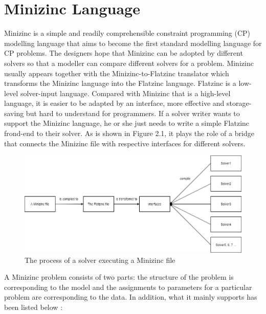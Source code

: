 \section{Minizinc Language}
Minizinc \cite{r10} is a simple and readily comprehensible constraint programming (CP) modelling language that aims to become the first standard modelling language for CP problems. The designers hope that Minizinc can be adopted by different solvers so that a modeller can compare different solvers for a problem. Minizinc usually appears together with the Minizinc-to-Flatzinc translator which transforms the Minizinc language into the Flatzinc language. Flatzinc \cite{r10} is a low-level solver-input language. Compared with Minizinc that is a high-level language, it is easier to be adapted by an interface, more effective and storage-saving but hard to understand for programmers. If a solver writer wants to support the Minizinc language, he or she just needs to write a simple Flatzinc frond-end to their solver. As is shown in Figure 2.1, it plays the role of a bridge that connects the Minizinc file with respective interfaces for different solvers. 
\begin{figure}[htbp]
\centering
\includegraphics[width=0.8\linewidth]{figs/flowofMinizinc.png}
\caption{The process of a solver executing a Minizinc file}
  \label{fig:process}
\end{figure}
A Minizinc problem consists of two parts: the structure of the problem is corresponding to the model and the assignments to parameters for a particular problem are corresponding to the data. In addition, what it mainly supports has been listed below \cite{r10}:\\
